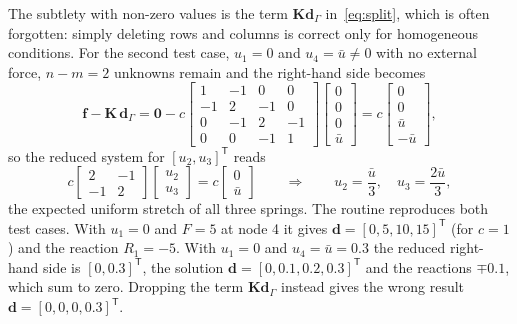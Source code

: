 \documentclass[11pt,a4paper]{article}
\numberwithin{equation}{section}
\theoremstyle{remark}
\newcommand{\bK}{\bm{K}}
\newcommand{\bd}{\bm{d}}
\newcommand{\bff}{\bm{f}}
\begin{document}
The subtlety with non-zero values is the term $\bK\bd_{\Gamma}$ in~\eqref{eq:split}, which
is often forgotten: simply deleting rows and columns is correct only for homogeneous
conditions. For the second test case, $u_1 = 0$ and $u_4 = \bar{u} \ne 0$ with no external
force, $n - m = 2$ unknowns remain and the right-hand side becomes
\begin{equation}\label{eq:rhs-nonzero}
  \bff - \bK\,\bd_{\Gamma}
  = \bm{0} - c\begin{bmatrix}
    1 & -1 & 0 & 0 \\ -1 & 2 & -1 & 0 \\ 0 & -1 & 2 & -1 \\ 0 & 0 & -1 & 1
  \end{bmatrix}
  \begin{bmatrix} 0 \\ 0 \\ 0 \\ \bar{u} \end{bmatrix}
  = c\begin{bmatrix} 0 \\ 0 \\ \bar{u} \\ -\bar{u}\end{bmatrix},
\end{equation}
so the reduced system for $[u_2, u_3]^{\mathsf{T}}$ reads
\begin{equation}\label{eq:reduced-nonzero}
  c\begin{bmatrix} 2 & -1 \\ -1 & 2 \end{bmatrix}
  \begin{bmatrix} u_2 \\ u_3 \end{bmatrix}
  = c\begin{bmatrix} 0 \\ \bar{u} \end{bmatrix}
  \qquad\Longrightarrow\qquad
  u_2 = \frac{\bar{u}}{3},
  \quad u_3 = \frac{2\bar{u}}{3},
\end{equation}
the expected uniform stretch of all three springs. The routine reproduces both test cases. With
$u_1 = 0$ and $F = 5$ at node 4 it gives $\bd = [0, 5, 10, 15]^{\mathsf{T}}$ (for $c = 1$) and the
reaction $R_1 = -5$. With $u_1 = 0$ and $u_4 = \bar u = 0.3$ the reduced right-hand side is
$[0, 0.3]^{\mathsf{T}}$, the solution $\bd = [0, 0.1, 0.2, 0.3]^{\mathsf{T}}$ and the reactions
$\mp 0.1$, which sum to zero. Dropping the term $\bK\bd_\Gamma$ instead gives the wrong result
$\bd = [0, 0, 0, 0.3]^{\mathsf{T}}$.
\end{document}
